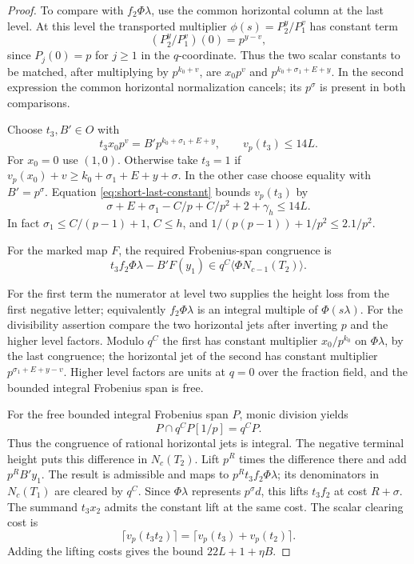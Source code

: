 \begin{proof}
To compare with \(f_2\Phi\lambda\), use the common horizontal
column at the last level. At this level the transported multiplier
\(\phi(s)=P_2^y/P_1^v\) has constant term
\[
 (P_2^y/P_1^v)(0)=p^{y-v},
\]
since \(P_j(0)=p\) for \(j\ge1\) in the \(q\)-coordinate.
Thus the two scalar constants to be matched, after multiplying
by \(p^{k_0+v}\), are \(x_0p^v\) and
\(p^{k_0+\sigma_1+E+y}\). In the second expression the
common horizontal normalization cancels; its \(p^\sigma\) is
present in both comparisons.

Choose \(t_3,B'\in O\) with
\[
 t_3 x_0p^v=B' p^{k_0+\sigma_1+E+y},\qquad v_p(t_3)\le14L .
\]
For \(x_0=0\) use \((1,0)\). Otherwise take \(t_3=1\) if
\(v_p(x_0)+v\ge k_0+\sigma_1+E+y+\sigma\). In the other
case choose equality with \(B'=p^\sigma\). Equation
\eqref{eq:short-last-constant} bounds \(v_p(t_3)\) by
\[
 \sigma+E+\sigma_1-C/p+C/p^2+2+\gamma_h\le14L .
\]
In fact \(\sigma_1\le C/(p-1)+1\), \(C\le h\), and
\(1/(p(p-1))+1/p^2\le 2.1/p^2\).

For the marked map \(F\), the required Frobenius-span congruence is
\[
 t_3 f_2\Phi\lambda-B' F(y_1)\in q^C\langle\Phi N_{c-1}(T_2)\rangle.
\]

For the first term the numerator at level two supplies the
height loss from the first negative letter; equivalently
\(f_2\Phi\lambda\) is an integral multiple of
\(\Phi(s\lambda)\). For the divisibility assertion compare
the two horizontal jets after inverting \(p\) and the higher
level factors. Modulo \(q^C\) the first has constant multiplier
\(x_0/p^{k_0}\) on \(\Phi\lambda\), by the last congruence;
the horizontal jet of the second has constant multiplier
\(p^{\sigma_1+E+y-v}\). Higher level factors are units at
\(q=0\) over the fraction field, and the bounded integral
Frobenius span is free.

For the free bounded integral Frobenius span \(P\), monic division yields
\[
 P\cap q^C P[1/p]=q^C P.
\]
Thus the congruence of rational horizontal jets is integral. The negative terminal
height puts this difference in \(N_c(T_2)\). Lift \(p^R\)
times the difference there and add \(p^R B' y_1\).
The result is admissible and maps to \(p^Rt_3 f_2\Phi\lambda\);
its denominators in \(N_c(T_1)\) are cleared by \(q^C\).
Since \(\Phi\lambda\) represents \(p^\sigma d\), this
lifts \(t_3f_2\) at cost \(R+\sigma\). The summand \(t_3x_2\)
admits the constant lift at the same cost. The scalar clearing cost is
\[
 \lceil v_p(t_3t_2)\rceil=\lceil v_p(t_3)+v_p(t_2)\rceil.
\]
Adding the lifting costs gives the bound \(22L+1+\eta B\).
\end{proof}

